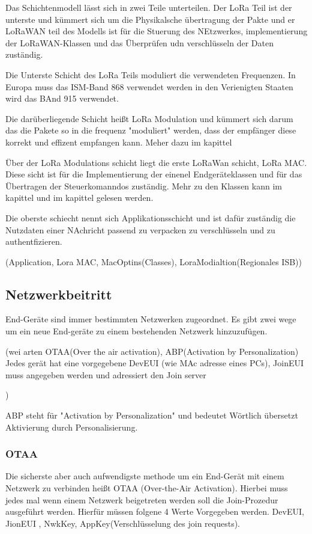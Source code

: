 \documentclass[a4paper,12pt]{article}
\begin{document}
            Das Schichtenmodell lässt sich in zwei Teile unterteilen. Der LoRa Teil ist der unterste und kümmert sich um die Physikalsche übertragung der Pakte und er LoRaWAN teil des Modells ist für die Stuerung des NEtzwerkes, implementierung der LoRaWAN-Klassen und das Überprüfen udn verschlüsseln der Daten zuständig.

            Die Unterste Schicht des LoRa Teils moduliert die verwendeten Frequenzen. In Europa muss das ISM-Band 868 verwendet werden in den Verienigten Staaten wird das BAnd 915 verwendet.

            Die darüberliegende Schicht heißt LoRa Modulation und kümmert sich darum das die Pakete so in die frequenz "moduliert" werden, dass der empfänger diese korrekt und effizent empfangen kann. Meher dazu im kapittel 

            Über der LoRa Modulations schicht liegt die erste LoRaWan schicht, LoRa MAC. Diese sicht ist für die Implementierung der einenel Endgeräteklassen und für das Übertragen der Steuerkomanndos zuständig. Mehr zu den Klassen kann im kapittel  und im kapittel  gelesen werden.

            Die oberste schiecht nennt sich Applikationsschicht und ist dafür zuständig die Nutzdaten einer NAchricht passend zu verpacken zu verschlüsseln und zu authentfizieren.

            \cite{WhatIsLoRa}(Application, Lora MAC, MacOptins(Classes), LoraModialtion(Regionales ISB))
        \subsection{Netzwerkbeitritt}
            End-Geräte sind immer bestimmten Netzwerken zugeordnet. Es gibt zwei wege um ein neue End-geräte zu einem bestehenden Netzwerk hinzuzufügen.

            \cite{LoRaSpec}(wei arten OTAA(Over the air activation), ABP(Activation by Personalization)
                    Jedes gerät hat eine vorgegebene DevEUI (wie MAc adresse eines PCs), JoinEUI muss angegeben werden und adressiert den Join server 
                    
            )
            
            
                ABP steht für "Activation by Personalization" und bedeutet Wörtlich übersetzt Aktivierung durch Personalisierung. 

            
            \subsubsection{OTAA}
            Die sicherste aber auch aufwendigste methode um ein End-Gerät mit einem Netzwerk zu verbinden heißt OTAA (Over-the-Air Activation). Hierbei muss jedes mal wenn einem Netzwerk beigetreten werden soll die Join-Prozedur ausgeführt werden.
            Hierfür müssen folgene 4 Werte Vorgegeben werden. DevEUI, JionEUI , NwkKey, AppKey(Verschlüsselung des join requests).
\end{document}
